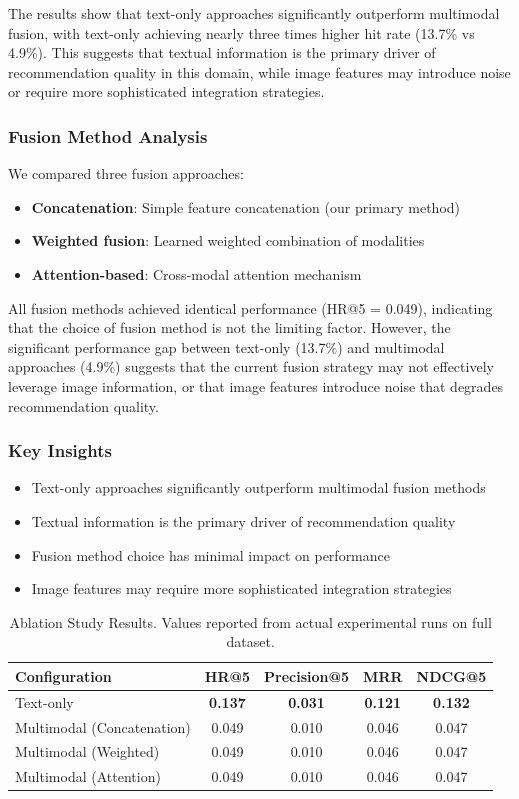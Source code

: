 \documentclass[conference]{IEEEtran}
\begin{document}
The results show that text-only approaches significantly outperform multimodal fusion, with text-only achieving nearly three times higher hit rate (13.7\% vs 4.9\%). This suggests that textual information is the primary driver of recommendation quality in this domain, while image features may introduce noise or require more sophisticated integration strategies.

\subsubsection{Fusion Method Analysis}
We compared three fusion approaches:
\begin{itemize}
    \item \textbf{Concatenation}: Simple feature concatenation (our primary method)
    \item \textbf{Weighted fusion}: Learned weighted combination of modalities
    \item \textbf{Attention-based}: Cross-modal attention mechanism
\end{itemize}

All fusion methods achieved identical performance (HR@5 = 0.049), indicating that the choice of fusion method is not the limiting factor. However, the significant performance gap between text-only (13.7\%) and multimodal approaches (4.9\%) suggests that the current fusion strategy may not effectively leverage image information, or that image features introduce noise that degrades recommendation quality.

\subsubsection{Key Insights}
\begin{itemize}
    \item Text-only approaches significantly outperform multimodal fusion methods
    \item Textual information is the primary driver of recommendation quality
    \item Fusion method choice has minimal impact on performance
    \item Image features may require more sophisticated integration strategies
\end{itemize}

\begin{table}[h]
\centering
\caption{Ablation Study Results. Values reported from actual experimental runs on full dataset.}
\label{tab:ablation}
\begin{tabular}{l|c|c|c|c}
\hline
Configuration & HR@5 & Precision@5 & MRR & NDCG@5 \\
\hline
Text-only & \textbf{0.137} & \textbf{0.031} & \textbf{0.121} & \textbf{0.132} \\
Multimodal (Concatenation) & 0.049 & 0.010 & 0.046 & 0.047 \\
Multimodal (Weighted) & 0.049 & 0.010 & 0.046 & 0.047 \\
Multimodal (Attention) & 0.049 & 0.010 & 0.046 & 0.047 \\
\hline
\end{tabular}
\end{table}
\end{document}
